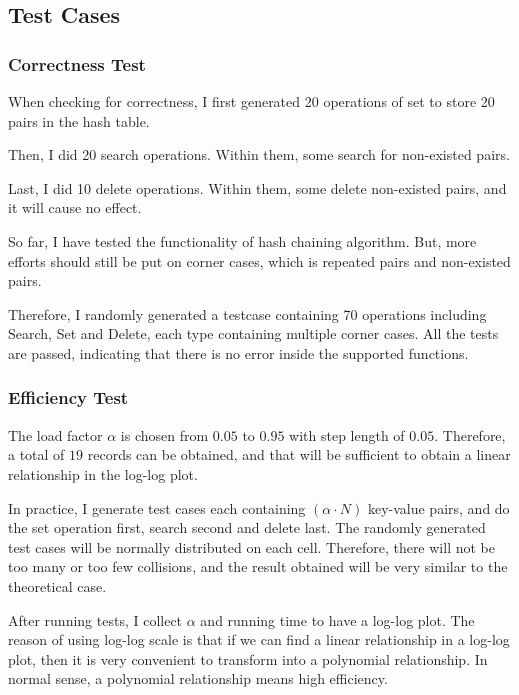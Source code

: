 \documentclass{article}
\begin{document}
\begin{spacing}{1.2}
\subsection{Test Cases}
\subsubsection{Correctness Test}
When checking for correctness, I first generated 20 operations of set to store 20 pairs in the hash table.

Then, I did 20 search operations. Within them, some search for non-existed pairs.

Last, I did 10 delete operations. Within them, some delete non-existed pairs, and it will cause no effect.

So far, I have tested the functionality of hash chaining algorithm. But, more efforts should still be put on corner cases, which is repeated pairs and non-existed pairs.

Therefore, I randomly generated a testcase containing 70 operations including Search, Set and Delete, each type containing multiple corner cases. All the tests are passed, indicating that there is no error inside the supported functions.

\subsubsection{Efficiency Test}
The load factor $\alpha$ is chosen from $0.05$ to $0.95$ with step length of $0.05$. Therefore, a total of $19$ records can be obtained, and that will be sufficient to obtain a linear relationship in the log-log plot.

In practice, I generate test cases each containing $(\alpha\cdot N)$ key-value pairs, and do the set operation first, search second and delete last. The randomly generated test cases will be normally distributed on each cell. Therefore, there will not be too many or too few collisions, and the result obtained will be very similar to the theoretical case. 

After running tests, I collect $\alpha$ and running time to have a log-log plot. The reason of using log-log scale is that if we can find a linear relationship in a log-log plot, then it is very convenient to transform into a polynomial relationship. In normal sense, a polynomial relationship means high efficiency.


\end{spacing}
\end{document}
